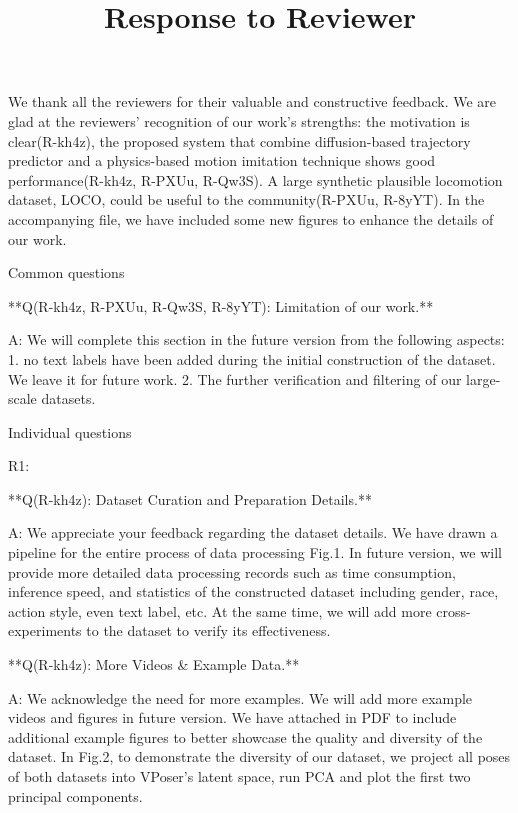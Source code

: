 \documentclass{article}
\title{Response to Reviewer}
\begin{document}
\begin{markdown}

\maketitle


We thank all the reviewers for their valuable and constructive feedback. We are glad at the reviewers’ recognition of our work's strengths: the motivation is clear(R-kh4z), the proposed system that combine diffusion-based trajectory predictor and a physics-based motion imitation technique shows good performance(R-kh4z, R-PXUu, R-Qw3S). A large synthetic plausible locomotion dataset, LOCO, could be useful to the community(R-PXUu, R-8yYT).
In the accompanying file, we have included some new figures to enhance the details of our work.

Common questions

**Q(R-kh4z, R-PXUu, R-Qw3S, R-8yYT): Limitation of our work.**

A: We will complete this section in the future version from the following aspects: 1. no text labels have been added during the initial construction of the dataset. We leave it for future work. 2. The further verification and filtering of our large-scale datasets.



Individual questions

R1:

**Q(R-kh4z): Dataset Curation and Preparation Details.**

A: We appreciate your feedback regarding the dataset details. We have drawn a pipeline for the entire process of data processing Fig.1. In future version, we will provide more detailed data processing records such as time consumption, inference speed, and statistics of the constructed dataset including gender, race, action style, even text label, etc. At the same time, we will add more cross-experiments to the dataset to verify its effectiveness.

**Q(R-kh4z): More Videos \& Example Data.**

A: We acknowledge the need for more examples. We will add more example videos and figures in future version. We have attached in PDF to include additional example figures to better showcase the quality and diversity of the dataset. In Fig.2, to demonstrate the diversity of our dataset, we project all poses of both datasets into VPoser’s latent space, run PCA and plot the first two principal components.


\end{markdown}
\end{document}
